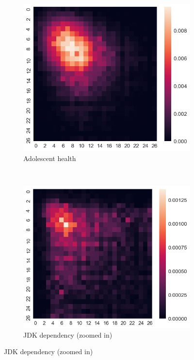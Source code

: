\documentclass[../document.tex]{subfiles}
\begin{document}
\bigskip
\begin{figure}[h]
    \centering
    \begin{subfigure}[b]{0.3\textwidth}
        \includegraphics[width=\textwidth]{img/heatmap_0}
        \caption*{Adolescent health}
    \end{subfigure}
    ~
    \begin{subfigure}[b]{0.3\textwidth}
        \includegraphics[width=\textwidth]{img/heatmap_1}
        \caption*{JDK dependency (zoomed in)}

\end{subfigure}
\end{figure}
\end{document}
